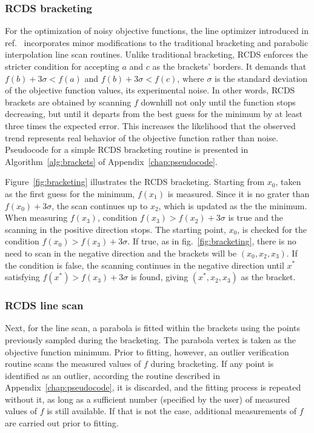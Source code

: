 \subsubsection{RCDS bracketing}
For the optimization of noisy objective functions, the line optimizer introduced in ref.~\cite{huang_algorithm_2013} incorporates minor modifications to the traditional bracketing and parabolic interpolation line scan routines. Unlike traditional bracketing, \gls*{RCDS} enforces the stricter condition for accepting $a$ and $c$ as the brackets' borders. It demands that $f(b) + 3\sigma < f(a)$ and $f(b) + 3\sigma < f(c)$, where $\sigma$ is the standard deviation of the objective function values, its experimental noise. In other words, \gls*{RCDS} brackets are obtained by scanning $f$ downhill not only until the function stops decreasing, but until it departs from the best guess for the minimum by at least three times the expected error. This increases the likelihood that the observed trend represents real behavior of the objective function rather than noise. Pseudocode for a simple \gls*{RCDS} bracketing routine is presented in Algorithm~\ref{alg:brackets} of Appendix~\ref{chap:pseudocode}.

Figure~\ref{fig:bracketing} illustrates the \gls*{RCDS} bracketing. Starting from $x_0$, taken as the first guess for the minimum, $f(x_1)$ is measured. Since it is no grater than $f(x_0)+3\sigma$, the scan continues up to $x_2$, which is updated as the the minimum. When measuring $f(x_3)$, condition $f(x_3) > f(x_2) + 3\sigma$ is true and the scanning in the positive direction stops. The starting point, $x_0$, is checked for the condition $f(x_0)>f(x_3)+3\sigma$. If true, as in fig.~\ref{fig:bracketing}, there is no need to scan in the negative direction and the brackets will be $(x_0, x_2, x_3)$. If the condition is false, the scanning continues in the negative direction until $x^*$ satisfying $f(x^*)>f(x_3)+3\sigma$ is found, giving $(x^*, x_2, x_3)$ as the bracket.

\subsubsection{RCDS line scan}
Next, for the line scan, a parabola is fitted within the brackets using the points previously sampled during the bracketing. The parabola vertex is taken as the objective function minimum. Prior to fitting, however, an outlier verification routine scans the measured values of $f$ during bracketing. If any point is identified as an outlier, according the routine described in Appendix~\ref{chap:pseudocode}, it is discarded, and the fitting process is repeated without it, as long as a sufficient number (specified by the user) of measured values of $f$ is still available. If that is not the case, additional measurements of $f$ are carried out prior to fitting.

